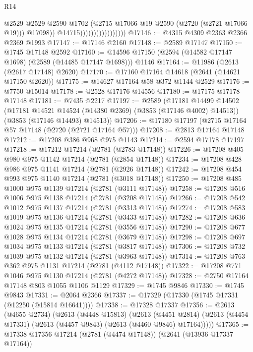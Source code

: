 \begin{lexlean}{R14}
\begin{coremodule}
                                          @2529
                                          @2529
                                          @2590
                                          @1702
                                          (@2715 @17066 @19 @2590 (@2720 (@2721 @17066 @19)))
                                          @17098))
                                      @14715)))))))))))))))))
@17146 := @4315 @4309 @2363 @2366 @2369 @1993
@17147 := @17146 @2160
@17148 := @2589 @17147
@17150 := @1745 @17148 @2592
@17160 := @14596 @17150 (@2594 (@14582 @17147 @1698) (@2589 (@14485 @17147 @1698))) @1146
@17164 := @11986 (@2613 (@2617 @17148) @2620)
@17170 := @17160 @17164 @14618 (@2641 (@14621 @17150 @2620))
@17175 := @14627 @17164 @58 @372 @1144 @2529
@17176 := @7750 @15014
@17178 := @2528 @17176 @14556
@17180 := @17175 @17178 @17148
@17181 := @7435 @2217
@17197 := @2589
    (@17181
      @14499
      @14502
      (@17181 @14521 @14524 (@14380 @2369) (@3853 (@17146 @4002) @14513))
      (@3853 (@17146 @14493) @14513))
@17206 := @17180 @17197 (@2715 @17164 @57 @17148 (@2720 (@2721 @17164 @57)))
@17208 := @2813 @17164 @17148
@17212 := @17208 @386 @968 @975 @1143
@17214 := @2594 @17178 @17197
@17218 := @17212 @17214 (@2781 (@2783 @17148))
@17226 := @17208 @405 @980 @975 @1142 @17214 (@2781 (@2854 @17148))
@17234 := @17208 @428 @986 @975 @1141 @17214 (@2781 (@2926 @17148))
@17242 := @17208 @454 @993 @975 @1140 @17214 (@2781 (@3018 @17148))
@17250 := @17208 @485 @1000 @975 @1139 @17214 (@2781 (@3111 @17148))
@17258 := @17208 @516 @1006 @975 @1138 @17214 (@2781 (@3208 @17148))
@17266 := @17208 @542 @1012 @975 @1137 @17214 (@2781 (@3313 @17148))
@17274 := @17208 @583 @1019 @975 @1136 @17214 (@2781 (@3433 @17148))
@17282 := @17208 @636 @1024 @975 @1135 @17214 (@2781 (@3556 @17148))
@17290 := @17208 @677 @1028 @975 @1134 @17214 (@2781 (@3679 @17148))
@17298 := @17208 @697 @1034 @975 @1133 @17214 (@2781 (@3817 @17148))
@17306 := @17208 @732 @1039 @975 @1132 @17214 (@2781 (@3963 @17148))
@17314 := @17208 @763 @362 @975 @1131 @17214 (@2781 (@4112 @17148))
@17322 := @17208 @771 @1046 @975 @1130 @17214 (@2781 (@4272 @17148))
@17328 := @2750 @17164 @17148 @803 @1055 @1106 @1129
@17329 := @1745 @9846
@17330 := @1745 @9843
@17331 := @2064 @2366
@17337 := @17329 (@17330 (@1745 @17331 (@12250 (@15814 @16641))))
@17338 := @17328 @17337
@17356 := @2613
    (@4655 @2734)
    (@2613
      (@4448 @15813)
      (@2613
        (@4451 @2814)
        (@2613 (@4454 @17331) (@2613 (@4457 @9843) (@2613 (@4460 @9846) @17164)))))
@17365 := @17338 @17356 @17214 (@2781 (@4474 @17148)) (@2641 (@13936 @17337 @17164))

\end{coremodule}
\end{lexlean}
